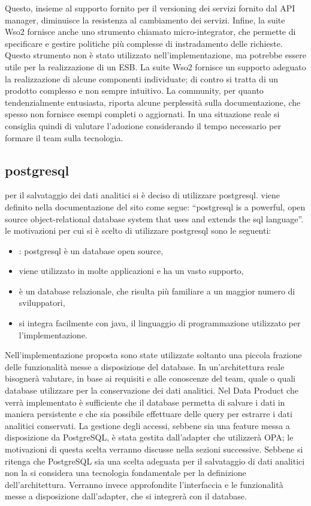 \documentclass[12pt]{report}
\begin{document}
Questo, insieme al supporto fornito per il versioning dei servizi fornito dal API manager, diminuisce la resistenza al cambiamento dei servizi. 
Infine, la suite Wso2 fornisce anche uno strumento chiamato micro-integrator, che permette di specificare e gestire politiche più complesse di instradamento delle richieste.
Questo strumento non è stato utilizzato nell'implementazione, ma potrebbe essere utile per la realizzazione di un ESB.
La suite Wso2 fornisce un supporto adeguato la realizzazione di alcune componenti individuate; di contro si tratta di un prodotto complesso e non sempre intuitivo.
La community, per quanto tendenzialmente entusiasta, riporta alcune perplessità sulla documentazione, che spesso non fornisce esempi completi o aggiornati.
In una situazione reale si consiglia quindi di valutare l'adozione considerando il tempo necessario per formare il team sulla tecnologia.

\subsection{postgresql}
per il salvataggio dei dati analitici si è deciso di utilizzare postgresql.
viene definito nella documentazione del sito come segue: ``postgresql is a powerful, open source object-relational database system that uses and extends the sql language''\cite{noauthor_postgresql_nodate}.
le motivazioni per cui si è scelto di utilizzare postgresql sono le seguenti:
\begin{itemize}
    \item: postgresql è un database open source,
    \item viene utilizzato in molte applicazioni e ha un vasto supporto,
    \item è un database relazionale, che risulta più familiare a un maggior numero di sviluppatori,
    \item si integra facilmente con java, il linguaggio di programmazione utilizzato per l'implementazione.
\end{itemize}
Nell'implementazione proposta sono state utilizzate soltanto una piccola frazione delle funzionalità messe a disposizione del database.
In un'architettura reale bisognerà valutare, in base ai requisiti e alle conoscenze del team, quale o quali database utilizzare per la conservazione dei dati analitici.
Nel Data Product che verrà implementato è sufficiente che il database permetta di salvare i dati in maniera persistente e che sia possibile effettuare delle query per estrarre i dati analitici conservati. 
La gestione degli accessi, sebbene sia una feature messa a disposizione da PostgreSQL, è stata gestita dall'adapter che utilizzerà OPA; le motivazioni di questa scelta verranno discusse nella sezioni successive.
Sebbene si ritenga che PostgreSQL sia una scelta adeguata per il salvataggio di dati analitici non la si considera una tecnologia fondamentale per la definizione dell'architettura.
Verranno invece approfondite l'interfaccia e le funzionalità messe a disposizione dall'adapter, che si integrerà con il database.
\end{document}
